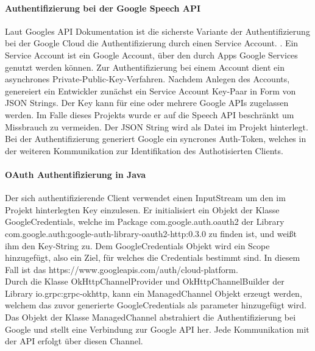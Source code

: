 \paragraph{Authentifizierung bei der Google Speech API}
Laut Googles API Dokumentation ist die sicherste Variante der Authentifizierung bei der Google Cloud die Authentifizierung durch einen Service Account. \cite{google_authenticating_2017}. Ein Service Account ist ein Google Account, über den durch Apps Google Services genutzt werden können. Zur Authentifizierung bei einem Account dient ein asynchrones Private-Public-Key-Verfahren. Nachdem Anlegen des Accounts, genereiert ein Entwickler zunächst ein Service Account Key-Paar in Form von JSON Strings. Der Key kann für eine oder mehrere Google APIs zugelassen werden. Im Falle dieses Projekts wurde er auf die Speech API beschränkt um Missbrauch zu vermeiden. Der JSON String wird als Datei im Projekt hinterlegt. Bei der Authentifizierung generiert Google ein syncrones Auth-Token, welches in der weiteren Kommunikation zur Identifikation des Authotisierten Clients.\\

\paragraph{OAuth Authentifizierung in Java}
Der sich authentifizierende Client verwendet einen InputStream um den im Projekt hinterlegten Key einzulesen. Er initialisiert ein Objekt der Klasse GoogleCredentials, welche im Package com.google.auth.oauth2 der Library com.google.auth:google-auth-library-oauth2-http:0.3.0 zu finden ist, und weißt ihm den Key-String zu. Dem GoogleCredentials Objekt wird ein Scope hinzugefügt, also ein Ziel, für welches die Credentials bestimmt sind. In diesem Fall ist das https://www.googleapis.com/auth/cloud-platform.\\
Durch die Klasse OkHttpChannelProvider und OkHttpChannelBuilder der Library io.grpc:grpc-okhttp, kann ein ManagedChannel Objekt erzeugt werden, welchem das zuvor generierte GoogleCredentials als parameter hinzugefügt wird. Das Objekt der Klasse ManagedChannel abstrahiert die Authentifizierung bei Google und stellt eine Verbindung zur Google API her. Jede Kommunikation mit der API erfolgt über diesen Channel.

